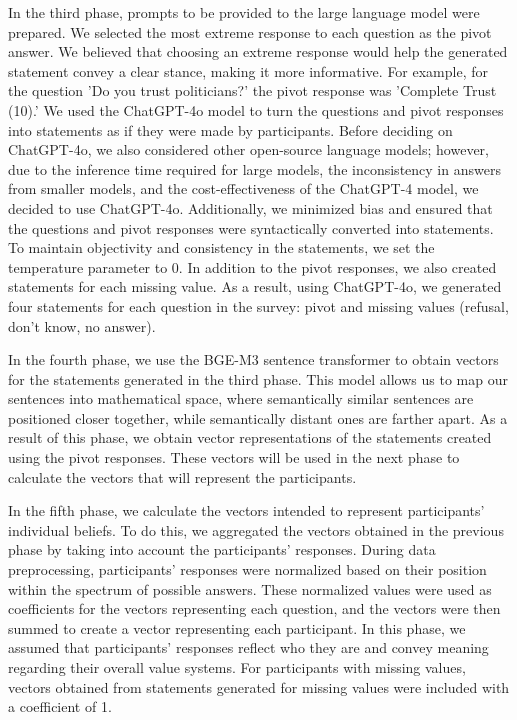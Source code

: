 In the third phase, prompts to be provided to the large language model were prepared. We selected the most extreme response to each question as the pivot answer. We believed that choosing an extreme response would help the generated statement convey a clear stance, making it more informative. For example, for the question 'Do you trust politicians?' the pivot response was 'Complete Trust (10).' We used the ChatGPT-4o model to turn the questions and pivot responses into statements as if they were made by participants. Before deciding on ChatGPT-4o, we also considered other open-source language models; however, due to the inference time required for large models, the inconsistency in answers from smaller models, and the cost-effectiveness of the ChatGPT-4 model, we decided to use ChatGPT-4o. Additionally, we minimized bias and ensured that the questions and pivot responses were syntactically converted into statements. To maintain objectivity and consistency in the statements, we set the temperature parameter to 0. In addition to the pivot responses, we also created statements for each missing value. As a result, using ChatGPT-4o, we generated four statements for each question in the survey: pivot and missing values (refusal, don't know, no answer).

In the fourth phase, we use the BGE-M3 sentence transformer to obtain vectors for the statements generated in the third phase. This model allows us to map our sentences into mathematical space, where semantically similar sentences are positioned closer together, while semantically distant ones are farther apart. As a result of this phase, we obtain vector representations of the statements created using the pivot responses. These vectors will be used in the next phase to calculate the vectors that will represent the participants.

In the fifth phase, we calculate the vectors intended to represent participants' individual beliefs. To do this, we aggregated the vectors obtained in the previous phase by taking into account the participants' responses. During data preprocessing, participants' responses were normalized based on their position within the spectrum of possible answers. These normalized values were used as coefficients for the vectors representing each question, and the vectors were then summed to create a vector representing each participant. In this phase, we assumed that participants' responses reflect who they are and convey meaning regarding their overall value systems. For participants with missing values, vectors obtained from statements generated for missing values were included with a coefficient of 1.

